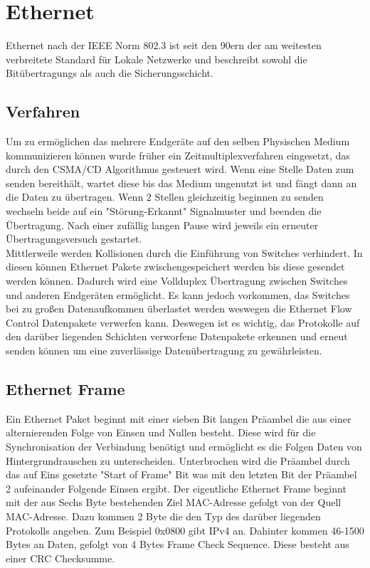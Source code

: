 \section{Ethernet}

Ethernet nach der IEEE Norm 802.3 ist seit den 90ern der am weitesten verbreitete Standard für Lokale Netzwerke und beschreibt sowohl die Bitübertragungs als auch die Sicherungsschicht. \\
\subsection{Verfahren}
Um zu ermöglichen das mehrere Endgeräte auf den selben Physischen Medium kommunizieren können wurde früher ein Zeitmultiplexverfahren eingesetzt, das durch den CSMA/CD Algorithmus gesteuert wird. Wenn eine Stelle Daten zum senden bereithält, wartet diese bis das Medium ungenutzt ist und fängt dann an die Daten zu übertragen. Wenn 2 Stellen gleichzeitig beginnen zu senden wechseln beide auf ein "Störung-Erkannt" Signalmuster und beenden die Übertragung. Nach einer zufällig langen Pause wird jeweils ein erneuter Übertragungsversuch gestartet.\\
Mittlerweile werden Kollisionen durch die Einführung von Switches verhindert. In diesen können Ethernet Pakete zwischengespeichert werden bis diese gesendet werden können. Dadurch wird eine Vollduplex Übertragung zwischen Switches und anderen Endgeräten ermöglicht. Es kann jedoch vorkommen, das Switches bei zu großen Datenaufkommen überlastet werden weswegen die Ethernet Flow Control Datenpakete verwerfen kann. Deswegen ist es wichtig, das Protokolle auf den darüber liegenden Schichten verworfene Datenpakete erkennen und erneut senden können um eine zuverlässige Datenübertragung zu gewährleisten. 

\subsection{Ethernet Frame}

Ein Ethernet Paket beginnt mit einer sieben Bit langen Präambel die aus einer alternierenden Folge von Einsen und Nullen besteht. Diese wird für die Synchronisation der Verbindung benötigt und ermöglicht es die Folgen Daten von Hintergrundrauschen zu unterscheiden. Unterbrochen wird die Präambel durch das auf Eins gesetzte "Start of Frame" Bit was mit den letzten Bit der Präambel 2 aufeinander Folgende Einsen ergibt. 
Der eigentliche Ethernet Frame beginnt mit der aus Sechs Byte bestehenden Ziel MAC-Adresse gefolgt von der Quell MAC-Adresse. 
Dazu kommen 2 Byte die den Typ des darüber liegenden Protokolls angeben. Zum Beispiel 0x0800 gibt IPv4 an. Dahinter kommen 46-1500 Bytes an Daten, gefolgt von 4 Bytes Frame Check Sequence. Diese besteht aus einer CRC Checksumme. 



